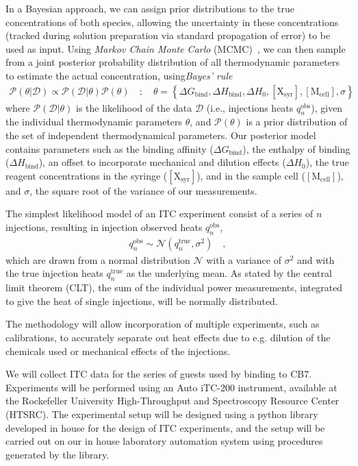 \documentclass[10pt,final]{article}
\begin{document}
In a Bayesian approach, we can assign prior distributions to the true concentrations of both species, allowing the uncertainty in these concentrations (tracked during solution preparation via standard propagation of error) to be used as input.
Using \textit{Markov Chain Monte Carlo} (MCMC)~\autocite{Metropolis1953a,Hastings1970a}, we can then sample from a joint posterior probability distribution of all thermodynamic parameters to estimate the actual concentration, using\textit{Bayes' rule} 
%
\begin{align}
	\mathcal{P}\left(\theta | \mathcal{D} \right) \propto  \mathcal{P}(\mathcal{D} | \theta) \mathcal{P}\left(\theta\right) \quad;\quad \theta   =  \left\{ \Delta G_\mathrm{bind}, \Delta H_\mathrm{bind}, \Delta H_0, [\mathrm{X_{syr}}], [\mathrm{M_{cell}}], \sigma \right\}
\end{align}
%
where $\mathcal{P}(\mathcal{D}|\theta)$ is the likelihood of the data $\mathcal{D}$ (i.e., injections heats $q_n^\mathrm{obs}$), given the individual thermodynamic parameters $\theta$, and $\mathcal{P}(\theta)$ is a prior distribution of the set of independent thermodynamical parameters. Our posterior model contains parameters such as the binding affinity ($\Delta G_\mathrm{bind}$), the enthalpy of binding ($\Delta H_\mathrm{bind}$), an offset to incorporate mechanical and dilution effects ($\Delta H_0$),  the true reagent concentrations in the syringe ($[\mathrm{X_{syr}}]$), and in the sample cell ($[\mathrm{M_{cell}}]$), and $\sigma$, the square root of the variance of our measurements.

The simplest likelihood model of an ITC experiment consist of a series of $n$ injections, resulting in injection observed heats $q_n^\mathrm{obs}$,
%
\begin{align}
	q_n^\mathrm{obs} \sim \mathcal{N}(q_n^\mathrm{true}, \sigma^2) \quad ,
\end{align}
%
which are drawn from a normal distribution $\mathcal{N}$ with a variance of $\sigma^2$ and with the true injection heats $q_n^\mathrm{true}$ as the underlying mean. As stated by the central limit theorem (CLT), the sum of the individual power measurements, integrated to give the heat of single injections, will be normally distributed.

The methodology will allow incorporation of multiple experiments, such as calibrations, to accurately separate out heat effects due to e.g. dilution of the chemicals used or mechanical effects of the injections.

We will collect ITC data for the series of guests used by \textcite{Cao2013a} binding to CB7. Experiments will be performed using an Auto iTC-200 instrument, available at the Rockefeller University High-Throughput and Spectroscopy Resource Center (HTSRC). The experimental setup will be designed using a python library  developed in house for the design of ITC experiments, and the setup will be carried out on our in house laboratory automation system using procedures generated by the library.
\end{document}

